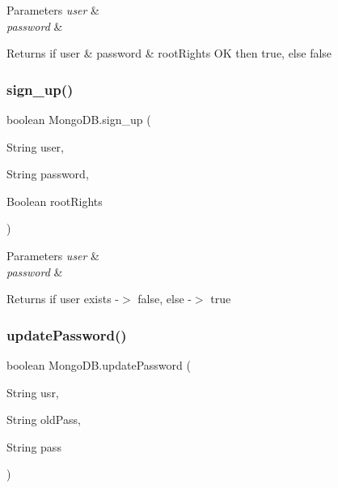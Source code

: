 \begin{DoxyParams}{Parameters}
{\em user} & \\
\hline
{\em password} & \\
\hline
\end{DoxyParams}
\begin{DoxyReturn}{Returns}
if user \& password \& root\+Rights OK then true, else false 
\end{DoxyReturn}
\mbox{\label{class_mongo_d_b_a9c69be7c091bffc9d1950e118fdb2251}} 
\subsubsection{\texorpdfstring{sign\+\_\+up()}{sign\_up()}}
{\footnotesize\ttfamily boolean Mongo\+D\+B.\+sign\+\_\+up (\begin{DoxyParamCaption}\item[{String}]{user,  }\item[{String}]{password,  }\item[{Boolean}]{root\+Rights }\end{DoxyParamCaption})}


\begin{DoxyParams}{Parameters}
{\em user} & \\
\hline
{\em password} & \\
\hline
\end{DoxyParams}
\begin{DoxyReturn}{Returns}
if user exists -\/$>$ false, else -\/$>$ true 
\end{DoxyReturn}
\mbox{\label{class_mongo_d_b_a3dcc0c59c2074af772c4dc23411b7d6a}} 
\subsubsection{\texorpdfstring{update\+Password()}{updatePassword()}}
{\footnotesize\ttfamily boolean Mongo\+D\+B.\+update\+Password (\begin{DoxyParamCaption}\item[{String}]{usr,  }\item[{String}]{old\+Pass,  }\item[{String}]{pass }\end{DoxyParamCaption})}



